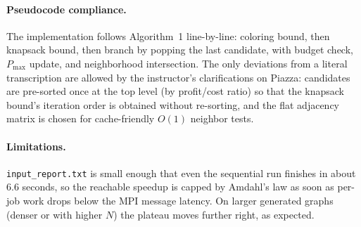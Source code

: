 \documentclass[11pt]{article}
\begin{document}
\paragraph{Pseudocode compliance.} The implementation follows Algorithm~1 line-by-line: coloring bound, then knapsack bound, then branch by popping the last candidate, with budget check, $P_{\max}$ update, and neighborhood intersection. The only deviations from a literal transcription are allowed by the instructor's clarifications on Piazza: candidates are pre-sorted once at the top level (by profit/cost ratio) so that the knapsack bound's iteration order is obtained without re-sorting, and the flat adjacency matrix is chosen for cache-friendly $O(1)$ neighbor tests.

\paragraph{Limitations.} \texttt{input\_report.txt} is small enough that even the sequential run finishes in about 6.6 seconds, so the reachable speedup is capped by Amdahl's law as soon as per-job work drops below the MPI message latency. On larger generated graphs (denser or with higher $N$) the plateau moves further right, as expected.
\end{document}
